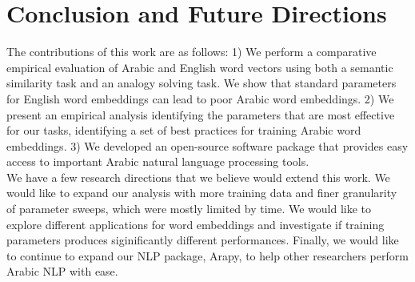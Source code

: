 \section{Conclusion and Future Directions}
\label{sec:conclusion}

The contributions of this work are as follows: 1) We perform a comparative empirical evaluation of Arabic and English word vectors using both a semantic similarity task and an analogy solving task. We show that standard parameters for English word embeddings can lead to poor Arabic word embeddings. 2) We present an empirical analysis identifying the parameters that are most effective for our tasks, identifying a set of best practices for training Arabic word embeddings. 3) We developed an open-source software package that provides easy access to important Arabic natural language processing tools. 
\\
We have a few research directions that we believe would extend this work. We would like to expand our analysis with more training data and finer granularity of parameter sweeps, which were mostly limited by time. We would like to explore different applications for word embeddings and investigate if training parameters produces siginificantly different performances. Finally, we would like to continue to expand our NLP package, Arapy, to help other researchers perform Arabic NLP with ease.